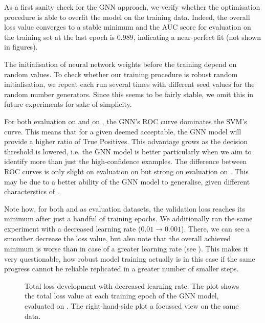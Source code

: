 \documentclass[
	fontsize=10pt, %
	twoside=false, %
	secnumdepth=1, %
  toc=indentunnumbered %
]{kaobook}
\begin{document}
As a first sanity check for the GNN approach, we verify whether the optimisation
procedure is able to overfit the model on the training data. Indeed, the overall
loss value converges to a stable minimum and the AUC score for evaluation on the
training set at the last epoch is $0.989$, indicating a near-perfect fit (not
shown in figures).

The initialisation of neural network weights before the training depend on
random values. To check whether our training procedure is robust \wrt random
initialisation, we repeat each run several times with different seed values for
the random number generators. Since this seems to be fairly stable, we omit this
in future experiments for sake of simplicity.

For both evaluation on \PDMap and on \ReconMap, the GNN's ROC curve dominates
the SVM's curve. This means that for a given \FPR deemed acceptable, the GNN
model will provide a higher ratio of True Positives. This advantage grows as the
decision threshold is lowered, i.e. the GNN model is better particularly when we
aim to identify more than just the high-confidence examples. The difference
between ROC curves is only slight on evaluation on \PDMap but strong on
evaluation on \ReconMap. This may be due to a better ability of the GNN model to
generalise, given different characterstics of \ReconMap.

Note how, for both \PDMap and \ReconMap as evaluation datasets, the validation
loss reaches its minimum after just a handful of training epochs. We
additionally ran the same experiment with a decreased learning rate ($0.01
\rightarrow 0.001$). There, we can see a smoother decrease the loss value, but
also note that the overall achieved minimum is worse than in case of a greater
learning rate (see ). This makes it
very questionable, how robust model training actually is in this case if the
same progress cannot be reliable replicated in a greater number of smaller steps.
\begin{figure}[h]
  \centering
  \begin{subfigure}[h]{0.49\linewidth}
  \end{subfigure}
  \begin{subfigure}[h]{0.49\linewidth}
  \end{subfigure}
  \caption{Total loss development with decreased learning rate. The plot shows
    the total loss value at each training epoch of the GNN model, evaluated on
    \ReconMap. The right-hand-side plot a focussed view on the same data.}
  \label{fig:svm-repro-lowlr-reconmapolder-loss}
\end{figure}
\end{document}
